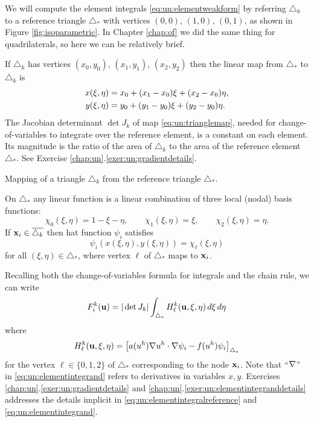We will compute the element integrals \eqref{eq:un:elementweakform} by referring $\triangle_k$ to a reference triangle $\triangle_\ast$ with vertices $(0,0),\,(1,0),\,(0,1)$, as shown in Figure \ref{fig:isoparametric}.  In Chapter \ref{chap:of} we did the same thing for quadrilaterals, so here we can be relatively brief.

If $\triangle_k$ has vertices $(x_0,y_0),\,(x_1,y_1),\,(x_2,y_2)$ then the linear map from $\triangle_\ast$ to $\triangle_k$ is
\begin{align}
x(\xi,\eta) &= x_0 + (x_1-x_0) \xi + (x_2-x_0) \eta, \label{eq:un:trianglemap} \\
y(\xi,\eta) &= y_0 + (y_1-y_0) \xi + (y_2-y_0) \eta. \notag
\end{align}
The Jacobian determinant $\det J_k$ of map \eqref{eq:un:trianglemap}, needed for change-of-variables to integrate over the reference element, is a constant on each element.  Its magnitude is the ratio of the area of $\triangle_k$ to the area of the reference element $\triangle_\ast$.  See Exercise \ref{chap:un}.\ref{exer:un:gradientdetails}.

\begin{marginfigure}

\caption{Mapping of a triangle $\triangle_k$ from the reference triangle $\triangle_\ast$.}
\label{fig:isoparametric}
\end{marginfigure}

On $\triangle_\ast$ any linear function is a linear combination of three local (nodal) basis functions:
\begin{equation}
\chi_0(\xi,\eta) = 1-\xi-\eta, \qquad \chi_1(\xi,\eta) = \xi, \qquad \chi_2(\xi,\eta) = \eta. \label{eq:un:chiformulas}
\end{equation}
If $\mathbf{x}_i\in\overline{\triangle_k}$ then hat function $\psi_i$ satisfies
\begin{equation}
\psi_i(x(\xi,\eta),y(\xi,\eta)) = \chi_\ell(\xi,\eta) \label{eq:un:psichimap}
\end{equation}
for all $(\xi,\eta)\in\triangle_\ast$, where vertex $\ell$ of $\triangle_\ast$ maps to $\mathbf{x}_i$.

Recalling both the change-of-variables formula for integrals and the chain rule, we can write
\begin{equation}
F_i^k(\mathbf{u}) = |\det J_k| \int_{\triangle_\ast} H_\ell^k(\mathbf{u},\xi,\eta)\,d\xi\,d\eta \label{eq:un:elementintegralreference}
\end{equation}
where
\begin{equation}
H_\ell^k(\mathbf{u},\xi,\eta) = \left[a(u^h) \nabla u^h \cdot \nabla \psi_i - f(u^h) \psi_i\right]_{\triangle_\ast}  \label{eq:un:elementintegrand}
\end{equation}
for the vertex $\ell \in \{0,1,2\}$ of $\triangle_\ast$ corresponding to the node $\mathbf{x}_i$.  Note that ``$\nabla$'' in \eqref{eq:un:elementintegrand} refers to derivatives in variables $x,y$.  Exercises \ref{chap:un}.\ref{exer:un:gradientdetails} and \ref{chap:un}.\ref{exer:un:elementintegranddetails} addresses the details implicit in \eqref{eq:un:elementintegralreference} and \eqref{eq:un:elementintegrand}.

